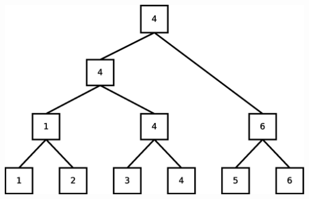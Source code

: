 \begin{center}
	\includegraphics[scale=0.4]{graficos/ArvTorneio1}
	\label{img:ArvTorneio1}
\end{center}

